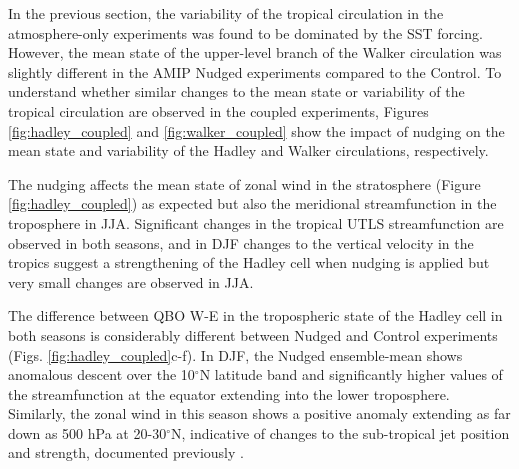 In the previous section, the variability of the tropical circulation in the atmosphere-only experiments was found to be dominated by the SST forcing. However, the mean state of the upper-level branch of the Walker circulation was slightly different in the AMIP Nudged experiments compared to the Control. 
To understand whether similar changes to the mean state or variability of the tropical circulation are observed in the coupled experiments, Figures \ref{fig:hadley_coupled} and \ref{fig:walker_coupled} show the impact of nudging on the mean state and variability of the Hadley and Walker circulations, respectively.

The nudging affects the mean state of zonal wind in the stratosphere (Figure \ref{fig:hadley_coupled}) as expected but also the meridional streamfunction in the troposphere in JJA. Significant changes in the tropical UTLS streamfunction are observed in both seasons, and in DJF changes to the vertical velocity in the tropics suggest a strengthening of the Hadley cell when nudging is applied but very small changes are observed in JJA. 

The difference between QBO W-E in the tropospheric state of the Hadley cell in both seasons is considerably different between Nudged and Control experiments (Figs. \ref{fig:hadley_coupled}c-f). 
In DJF, the Nudged ensemble-mean shows anomalous descent over the 10$^\circ$N latitude band and significantly higher values of the streamfunction at the equator extending into the lower troposphere. Similarly, the zonal wind in this season shows a positive anomaly extending as far down as 500 hPa at 20-30$^\circ$N, indicative of changes to the sub-tropical jet position and strength, documented previously \citep[e.g.][]{garfinkel2010}.

